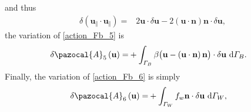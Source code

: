 and thus
\begin{align*}
  \delta \left( \mathbf{u}_{\Vert} \cdot \mathbf{u}_{\Vert} \right) = & 2 \mathbf{u} \cdot \delta \mathbf{u} - 2 \left( \mathbf{u} \cdot \mathbf{n} \right) \mathbf{n} \cdot \delta \mathbf{u},
\end{align*}
the variation of \cref{action_Fb_5} is
\begin{align}
  \label{action_variation_Fb_5}
  \delta \pazocal{A}_5 \left(\mathbf{u} \right) = &+ \int_{\Gamma_B} \beta \big( \mathbf{u} - \left( \mathbf{u} \cdot \mathbf{n} \right) \mathbf{n} \big) \cdot \delta \mathbf{u} \d{\Gamma_B}.
\end{align}
Finally, the variation of \cref{action_Fb_6} is simply
\begin{align}
  \label{action_variation_Fb_6}
  \delta \pazocal{A}_6 \left(\mathbf{u} \right) = &+ \int_{\Gamma_W} f_w \mathbf{n} \cdot \delta \mathbf{u} \d{\Gamma_W},
\end{align}
 
